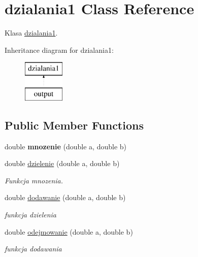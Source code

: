 \hypertarget{classdzialania1}{\section{dzialania1 Class Reference}
\label{classdzialania1}
}


Klasa \hyperlink{classdzialania1}{dzialania1}.  


Inheritance diagram for dzialania1\+:\begin{figure}[H]
\begin{center}
\leavevmode
\includegraphics[height=2.000000cm]{classdzialania1}
\end{center}
\end{figure}
\subsection*{Public Member Functions}
\begin{DoxyCompactItemize}
\item 
\hypertarget{classdzialania1_a51de4dbeaa29fc36166d433bf00d4a14}{double {\bfseries mnozenie} (double a, double b)}\label{classdzialania1_a51de4dbeaa29fc36166d433bf00d4a14}

\item 
\hypertarget{classdzialania1_a0eb93a4c85c2236908ba6a1871a4a3b7}{double \hyperlink{classdzialania1_a0eb93a4c85c2236908ba6a1871a4a3b7}{dzielenie} (double a, double b)}\label{classdzialania1_a0eb93a4c85c2236908ba6a1871a4a3b7}

\begin{DoxyCompactList}\small\item\em Funkcja mnozenia. \end{DoxyCompactList}\item 
\hypertarget{classdzialania1_a053b3cc0650eaf81e074c2b3c7501040}{double \hyperlink{classdzialania1_a053b3cc0650eaf81e074c2b3c7501040}{dodawanie} (double a, double b)}\label{classdzialania1_a053b3cc0650eaf81e074c2b3c7501040}

\begin{DoxyCompactList}\small\item\em funkcja dzielenia \end{DoxyCompactList}\item 
\hypertarget{classdzialania1_a333ddbd090054f0ada034fba32f38587}{double \hyperlink{classdzialania1_a333ddbd090054f0ada034fba32f38587}{odejmowanie} (double a, double b)}\label{classdzialania1_a333ddbd090054f0ada034fba32f38587}

\begin{DoxyCompactList}\small\item\em funkcja dodawania \end{DoxyCompactList}\end{DoxyCompactItemize}
